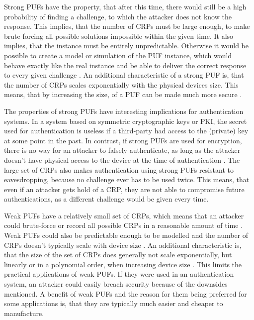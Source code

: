 Strong PUFs have the property, that after this time, there would still be a high probability of finding a challenge,
to which the attacker does not know the response.
This implies, that the number of \acp{CRP} must be large enough, to make brute forcing all possible solutions impossible
within the given time.
It also implies, that the instance must be entirely unpredictable. Otherwise it would be possible to create a model or
simulation of the PUF instance, which would behave exactly like the real instance and be able to
deliver the correct response to every given challenge \cite[][p.25]{Maes2013} \cite[][p. 66]{Guajardo}.
An additional characteristic of a strong PUF is, that the number of \acp{CRP} scales exponentially with the physical devices size.
This means, that by increasing the size, of a PUF can be made much more secure \cite[][p. 2]{McGrath2019}.

The properties of strong PUFs have interesting implications for authentication systems.
In a system based on symmetric cryptographic keys or \ac{PKI}, the secret used for authentication is useless
if a third-party had access to the (private) key at some point in the past. %
In contrast, if strong PUFs are used for encryption, there is no way for an attacker to falsely authenticate,
as long as the attacker doesn't have physical access to the device at the time of authentication \cite[][p. 2]{McGrath2019}.
The large set of \acp{CRP} also makes authentication using strong PUFs resistant to eavesdropping, because
no challenge ever has to be used twice. This means, that even if an attacker gets hold of a \ac{CRP}, they
are not able to compromise future authentications, as a different challenge would be given every time.

Weak PUFs have a relatively small set of \acp{CRP}, which means that an attacker
could brute-force or record all possible \acp{CRP} in a reasonable amount of time \cite[][p. 2]{McGrath2019}.
Weak PUFs could also be predictable enough to be modelled \cite[][p.25]{Maes2013} \cite[][p. 66]{Guajardo} and
the number of \acp{CRP} doesn't typically scale with device size \cite[][p. 2]{McGrath2019}.
An additional characteristic is, that the size of the set of \acp{CRP} does generally not scale exponentially,
but linearly or in a polynomial order, when increasing device size \cite[][p. 2]{McGrath2019}.
This limits the practical applications of weak PUFs. If they were used in an authentication system,
an attacker could easily breach security because of the downsides mentioned.
A benefit of weak PUFs and the reason for them being preferred for some applications is,
that they are typically much easier and cheaper to manufacture. \cite[][p.25]{Maes2013}

